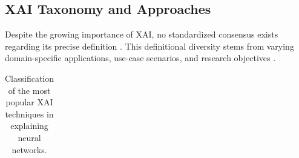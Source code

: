 \subsection{XAI Taxonomy and Approaches}

Despite the growing importance of XAI, no standardized consensus exists regarding its precise definition \cite{emmert2020explainable,adadi2018peeking,das2020opportunities}. This definitional diversity stems from varying domain-specific applications, use-case scenarios, and research objectives \cite{alicioglu2021survey}.

\begin{table}
    \centering
    \caption{Classification of the most popular XAI techniques in explaining neural networks.}
    \label{tab:xai_classification}
    \begin{adjustbox}{width=\textwidth,center}
        \begin{tabular}{|c|cc|cc|cc|}
        

\end{tabular}
\end{adjustbox}
\end{table}
